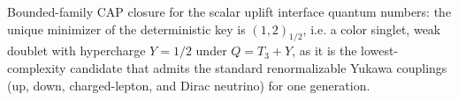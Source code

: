 \noindent Bounded-family CAP closure for the scalar uplift interface quantum numbers: the unique minimizer of the deterministic key is $(1,2)_{1/2}$, i.e. a color singlet, weak doublet with hypercharge $Y=1/2$ under $Q=T_3+Y$, as it is the lowest-complexity candidate that admits the standard renormalizable Yukawa couplings (up, down, charged-lepton, and Dirac neutrino) for one generation.